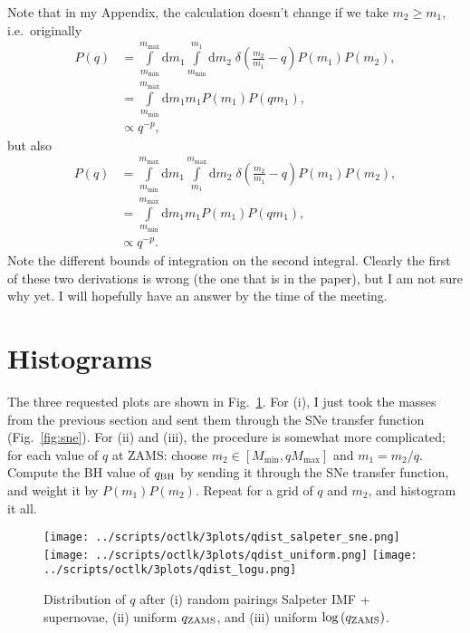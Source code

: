 \documentclass[11pt,
        usenames, %
        dvipsnames %
    ]{article}
\newcommand*{\p}[1]{\left(#1\right)}
\begin{document}
Note that in my Appendix, the calculation doesn't change if we take $m_2 \geq
m_1$, i.e.\ originally
\begin{align}
    P(q) &= \int\limits_{m_{\min}}^{m_{\max}}\mathrm{d}m_1
        \int\limits_{m_{\min}}^{m_1}\mathrm{d}m_2\;
                \delta\p{\frac{m_2}{m_1} - q}P(m_1) P(m_2),\\
        &= \int\limits_{m_{\min}}^{m_{\max}}\mathrm{d}m_1 m_1 P(m_1) P(qm_1),\\
        &\propto q^{-p},
\end{align}
but also
\begin{align}
    P(q) &= \int\limits_{m_{\min}}^{m_{\max}}\mathrm{d}m_1
        \int\limits_{m_1}^{m_{\max}}\mathrm{d}m_2\;
                \delta\p{\frac{m_2}{m_1} - q}P(m_1) P(m_2),\\
        &= \int\limits_{m_{\min}}^{m_{\max}}\mathrm{d}m_1 m_1 P(m_1) P(qm_1),\\
        &\propto q^{-p}.
\end{align}
Note the different bounds of integration on the second integral. Clearly the
first of these two derivations is wrong (the one that is in the paper), but I am
not sure why yet. I will hopefully have an answer by the time of the meeting.

\section{Histograms}

The three requested plots are shown in Fig.~\ref{fig:2}. For (i), I just took
the masses from the previous section and sent them through the SNe transfer
function (Fig.~\ref{fig:sne}). For (ii) and (iii), the procedure is somewhat
more complicated; for each value of $q$ at ZAMS\@: choose $m_2 \in [M_{\min},
qM_{\max}]$ and $m_1 = m_2 / q$. Compute the BH value of $q_{\rm BH}$ by sending
it through the SNe transfer function, and weight it by $P(m_1)P(m_2)$. Repeat
for a grid of $q$ and $m_2$, and histogram it all.
\begin{figure}
    \centering
    \texttt{[image: ../scripts/octlk/3plots/qdist\_salpeter\_sne.png]}
    \texttt{[image: ../scripts/octlk/3plots/qdist\_uniform.png]}
    \texttt{[image: ../scripts/octlk/3plots/qdist\_logu.png]}
    \caption{Distribution of $q$ after (i) random pairings Salpeter IMF +
    supernovae, (ii) uniform $q_{\rm ZAMS}$, and (iii) uniform $\log\p{q_{\rm
    ZAMS}}$.}\label{fig:2}
\end{figure}
\end{document}
